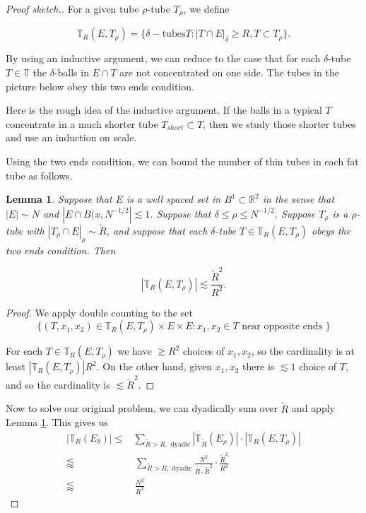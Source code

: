 \documentclass[12pt]{amsart}
\newtheorem{lemma}[theorem]{Lemma}
\newcommand{\RR}{\mathbb{R}}
\newcommand{\TT}{\mathbb{T}}
\begin{document}
\begin{proof} [Proof sketch.]
 For a given tube $\rho$-tube $T_\rho$,  we define
 
  $$\TT_R(E, T_\rho)= \{ \delta-\textrm{tubes} T: |T \cap E|_\delta \ge R,  T \subset T_\rho \}. $$

By using an inductive argument,  we can reduce to the case that for each $\delta$-tube $T \in \TT$ the $\delta$-balls in $E \cap T$ are not concentrated on one side.  The tubes in the picture below obey this two ends condition.

   \begin{figure}[h]
  \centering
  
\end{figure}

\noindent Here is the rough idea of the inductive argument.   If the balls in a typical $T$ concentrate in a much shorter tube $T_{short} \subset T$,  then we study those shorter tubes and use an induction on scale.

Using the two ends condition,  we can bound the number of thin tubes in each fat tube as follows.

\begin{lemma} \label{twoends} Suppose that $E$ is a well spaced set in $B^1 \subset \RR^2$ in the sense that $|E| \sim N$ and $|E \cap B(x, N^{-1/2}| \lesssim 1$.  Suppose that $\delta \le \rho \le N^{-1/2}$.   Suppose $T_\rho$ is a $\rho$-tube with $| T_\rho \cap E|_\rho \sim \tilde R$,  and suppose that each $\delta$-tube $T \in \TT_{R}(E, T_\rho)$ obeys the two ends condition.  
 Then 

$$ | \TT_R(E, T_\rho) | \lesssim \frac{\tilde R^2}{R^2}. $$

\end{lemma}

\begin{proof} 
  We apply double counting to the set
  \[
    \{ (T,x_1,x_2) \in \TT_R(E, T_\rho) \times E \times E  : x_1,x_2 \in T \text{ near opposite ends }\}
  \]

For each $T \in \TT_R(E, T_\rho)$ we have $\gtrsim R^2$ choices of $x_1, x_2$,  so the cardinality is at least $|\TT_R(E, T_\rho)| R^2$.   On the other hand,  given $x_1, x_2$ there is $\lesssim 1$ choice of $T$,  and so the cardinality is $\lesssim \tilde R^2$.  \end{proof}

  Now to solve our original problem, we can dyadically sum over $\tilde{R}$ and apply Lemma \ref{twoends}.
  This gives us
  \begin{align*}
    |\TT_R (E_\delta)| 
    \leq& \sum_{\tilde{R} > R, \text{ dyadic}} |\TT_{\tilde{R}} (E_\rho)| \cdot |\TT_R (E, T_\rho)| 
    \\ \lessapprox& \, \sum_{\tilde{R} > R, \text{ dyadic}} \frac{N^2}{R \cdot \tilde{R}^2} \cdot \frac{\tilde{R}^2}{R^2} 
    \\ \lessapprox& \, \frac{N^2}{R^3}
  \end{align*}
\end{proof}
\end{document}
